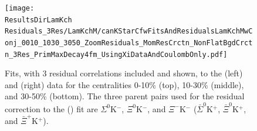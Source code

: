 \documentclass[../AnalysisNoteJBuxton.tex]{subfiles}
\begin{document}
\begin{figure}[h]
  \centering
  \texttt{[image: \\ResultsDirLamKch Residuals\_3Res/LamKchM/canKStarCfwFitsAndResidualsLamKchMwConj\_0010\_1030\_3050\_ZoomResiduals\_MomResCrctn\_NonFlatBgdCrctn\_3Res\_PrimMaxDecay4fm\_UsingXiDataAndCoulombOnly.pdf]}
  \caption[\LamKchMALamKchP Fits showing 3 Residuals]{Fits, with 3 residual correlations included and shown, to the \LamKchM (left) and \ALamKchP (right) data for the centralities 0-10\% (top), 10-30\% (middle), and 30-50\% (bottom).  The three parent pairs used for the residual correction to the \LamKchM (\ALamKchP) fit are $\Sigma^{0}$K$^{-}$, $\Xi^{0}$K$^{-}$, and $\Xi^{-}$K$^{-}$ ($\bar{\Sigma}^{0}$K$^{+}$, $\bar{\Xi}^{0}$K$^{+}$, and $\bar{\Xi}^{+}$K$^{+}$).}
  \label{fig:LamKchMwConjFitsAndResiduals_3Res}
\end{figure}
\end{document}
